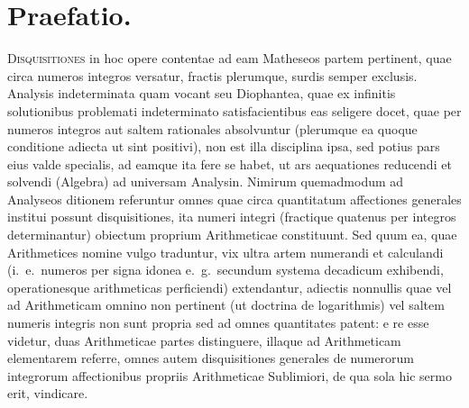 \documentclass[12pt,a4paper]{article}
\theoremstyle{plain}
\theoremstyle{definition}
\theoremstyle{remark}
\begin{document}
\section*{Praefatio.}

\lettrine[lines=3]{D}{isquisitiones} in hoc opere contentae ad eam Matheseos partem pertinent, quae circa numeros integros versatur, fractis plerumque, surdis semper exclusis. Analysis indeterminata quam vocant seu Diophantea, quae ex infinitis solutionibus problemati indeterminato satisfacientibus eas seligere docet, quae per numeros integros aut saltem rationales absolvuntur (plerumque ea quoque conditione adiecta ut sint positivi), non est illa disciplina ipsa, sed potius pars eius valde specialis, ad eamque ita fere se habet, ut ars aequationes reducendi et solvendi (Algebra) ad universam Analysin. Nimirum quemadmodum ad Analyseos ditionem referuntur omnes quae circa quantitatum affectiones generales institui possunt disquisitiones, ita numeri integri (fractique quatenus per integros determinantur) obiectum proprium Arithmeticae constituunt. Sed quum ea, quae Arithmetices nomine vulgo traduntur, vix ultra artem numerandi et calculandi (i.~e.\ numeros per signa idonea e.~g.\ secundum systema decadicum exhibendi, operationesque arithmeticas perficiendi) extendantur, adiectis nonnullis quae vel ad Arithmeticam omnino non pertinent (ut doctrina de logarithmis) vel saltem numeris integris non sunt propria sed ad omnes quantitates patent: e re esse videtur, duas Arithmeticae partes distinguere, illaque ad Arithmeticam elementarem referre, omnes autem disquisitiones generales de numerorum integrorum affectionibus propriis Arithmeticae Sublimiori, de qua sola hic sermo erit, vindicare.
\end{document}

